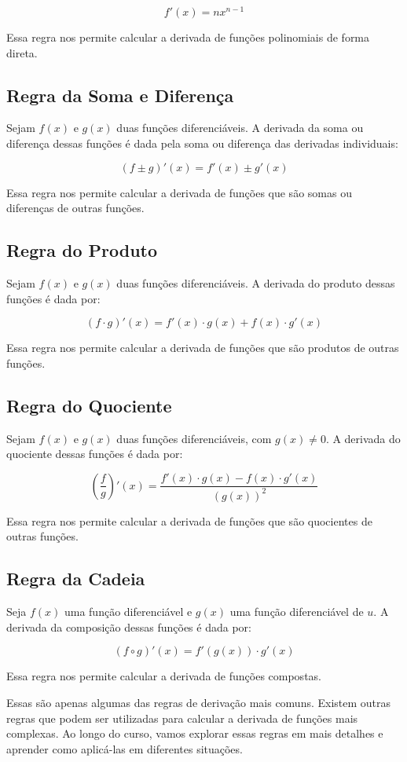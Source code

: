 \documentclass[12pt]{article}
\begin{document}
\[
f'(x) = nx^{n-1}
\]

Essa regra nos permite calcular a derivada de funções polinomiais de forma direta.

\subsection{Regra da Soma e Diferença}

Sejam $f(x)$ e $g(x)$ duas funções diferenciáveis. A derivada da soma ou diferença dessas funções é dada pela soma ou diferença das derivadas individuais:

\[
(f \pm g)'(x) = f'(x) \pm g'(x)
\]

Essa regra nos permite calcular a derivada de funções que são somas ou diferenças de outras funções.

\subsection{Regra do Produto}

Sejam $f(x)$ e $g(x)$ duas funções diferenciáveis. A derivada do produto dessas funções é dada por:

\[
(f \cdot g)'(x) = f'(x) \cdot g(x) + f(x) \cdot g'(x)
\]

Essa regra nos permite calcular a derivada de funções que são produtos de outras funções.

\subsection{Regra do Quociente}

Sejam $f(x)$ e $g(x)$ duas funções diferenciáveis, com $g(x) \neq 0$. A derivada do quociente dessas funções é dada por:

\[
\left(\frac{f}{g}\right)'(x) = \frac{f'(x) \cdot g(x) - f(x) \cdot g'(x)}{(g(x))^2}
\]

Essa regra nos permite calcular a derivada de funções que são quocientes de outras funções.

\subsection{Regra da Cadeia}

Seja $f(x)$ uma função diferenciável e $g(x)$ uma função diferenciável de $u$. A derivada da composição dessas funções é dada por:

\[
(f \circ g)'(x) = f'(g(x)) \cdot g'(x)
\]

Essa regra nos permite calcular a derivada de funções compostas.

Essas são apenas algumas das regras de derivação mais comuns. Existem outras regras que podem ser utilizadas para calcular a derivada de funções mais complexas. Ao longo do curso, vamos explorar essas regras em mais detalhes e aprender como aplicá-las em diferentes situações.
\end{document}
